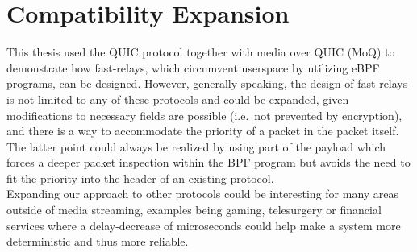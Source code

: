\section{Compatibility Expansion}\label{sec:compatibility_expansion}
This thesis used the QUIC protocol together with media over QUIC (MoQ)
to demonstrate how fast-relays, which circumvent userspace by utilizing eBPF programs, can be designed.
However, generally speaking, the design of fast-relays is not limited to
any of these protocols and could be expanded, given modifications to 
necessary fields are possible (i.e.~not prevented by encryption), and
there is a way to accommodate the priority of a packet in the packet itself.
The latter point could always be realized by using part of the payload
which forces a deeper packet inspection within the BPF program but 
avoids the need to fit the priority into the header of an existing 
protocol.
\\
Expanding our approach to other protocols could be interesting for 
many areas outside of media streaming, examples being gaming, 
telesurgery or financial services where a delay-decrease of 
microseconds could help make a system more deterministic and 
thus more reliable.